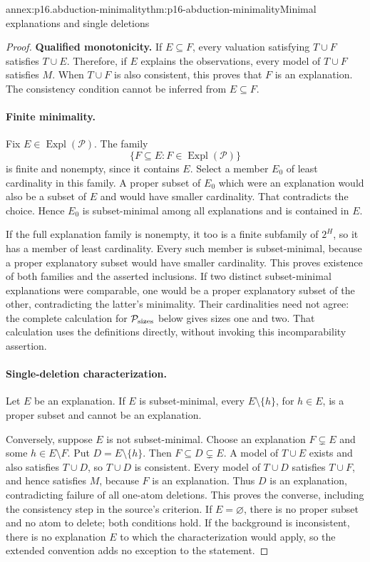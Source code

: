 \begin{annexitem}{annex:p16.abduction-minimality}{thm:p16-abduction-minimality}{Minimal explanations and single deletions}
\begin{proof}
\textbf{Qualified monotonicity.}\enspace
If \(E\subseteq F\), every valuation satisfying \(T\cup F\)
satisfies \(T\cup E\). Therefore, if \(E\) explains the observations,
every model of \(T\cup F\) satisfies \(M\). When \(T\cup F\)
is also consistent, this proves that \(F\) is an explanation. The
consistency condition cannot be inferred from \(E\subseteq F\).

\paragraph{Finite minimality.}
Fix \(E\in\operatorname{Expl}(\mathcal P)\). The family
\[
 \{F\subseteq E:F\in\operatorname{Expl}(\mathcal P)\}
\]
is finite and nonempty, since it contains \(E\). Select a member
\(E_0\) of least cardinality in this family. A proper subset of
\(E_0\) which were an explanation would also be a subset of \(E\)
and would have smaller cardinality. That contradicts the choice. Hence
\(E_0\) is subset-minimal among all explanations and is contained in
\(E\).

If the full explanation family is nonempty, it too is a finite subfamily
of \(2^H\), so it has a member of least cardinality. Every such member
is subset-minimal, because a proper explanatory subset would have smaller
cardinality. This proves existence of both families and the asserted
inclusions. If two distinct subset-minimal explanations were comparable,
one would be a proper explanatory subset of the other, contradicting the
latter's minimality. Their cardinalities need not agree: the complete
calculation for \(\mathcal P_{\rm sizes}\) below gives sizes one and two.
That calculation uses the definitions directly, without invoking this
incomparability assertion.

\paragraph{Single-deletion characterization.}
Let \(E\) be an explanation. If \(E\) is subset-minimal, every
\(E\setminus\{h\}\), for \(h\in E\), is a proper subset and
cannot be an explanation.

Conversely, suppose \(E\) is not subset-minimal. Choose an explanation
\(F\subsetneq E\) and some \(h\in E\setminus F\). Put
\(D=E\setminus\{h\}\). Then \(F\subseteq D\subsetneq E\).
A model of \(T\cup E\) exists and also satisfies \(T\cup D\),
so \(T\cup D\) is consistent. Every model of \(T\cup D\)
satisfies \(T\cup F\), and hence satisfies \(M\), because \(F\)
is an explanation. Thus \(D\) is an explanation, contradicting failure
of all one-atom deletions. This proves the converse, including the
consistency step in the source's criterion. If \(E=\varnothing\),
there is no proper subset and no atom to delete; both conditions hold.
If the background is inconsistent, there is no explanation \(E\) to
which the characterization would apply, so the extended convention adds
no exception to the statement.


\end{proof}
\end{annexitem}
